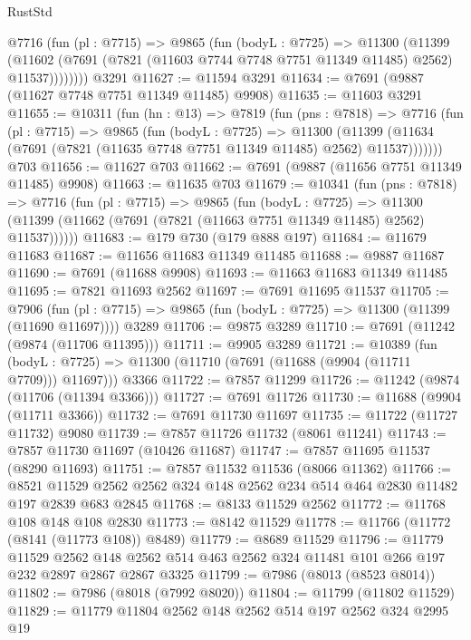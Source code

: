 \begin{lexlean}{RustStd}
\begin{coremodule}
        @7716
          (fun (pl : @7715) =>
          @9865
            (fun (bodyL : @7725) =>
            @11300
              (@11399
                (@11602 (@7691 (@7821 (@11603 @7744 @7748 @7751 @11349 @11485) @2562) @11537))))))))
    @3291
@11627 := @11594 @3291
@11634 := @7691 (@9887 (@11627 @7748 @7751 @11349 @11485) @9908)
@11635 := @11603 @3291
@11655 := @10311
    (fun (hn : @13) =>
    @7819
      (fun (pns : @7818) =>
      @7716
        (fun (pl : @7715) =>
        @9865
          (fun (bodyL : @7725) =>
          @11300
            (@11399 (@11634 (@7691 (@7821 (@11635 @7748 @7751 @11349 @11485) @2562) @11537)))))))
    @703
@11656 := @11627 @703
@11662 := @7691 (@9887 (@11656 @7751 @11349 @11485) @9908)
@11663 := @11635 @703
@11679 := @10341
    (fun (pns : @7818) =>
    @7716
      (fun (pl : @7715) =>
      @9865
        (fun (bodyL : @7725) =>
        @11300 (@11399 (@11662 (@7691 (@7821 (@11663 @7751 @11349 @11485) @2562) @11537))))))
@11683 := @179 @730 (@179 @888 @197)
@11684 := @11679 @11683
@11687 := @11656 @11683 @11349 @11485
@11688 := @9887 @11687
@11690 := @7691 (@11688 @9908)
@11693 := @11663 @11683 @11349 @11485
@11695 := @7821 @11693 @2562
@11697 := @7691 @11695 @11537
@11705 := @7906
    (fun (pl : @7715) => @9865 (fun (bodyL : @7725) => @11300 (@11399 (@11690 @11697))))
    @3289
@11706 := @9875 @3289
@11710 := @7691 (@11242 (@9874 (@11706 @11395)))
@11711 := @9905 @3289
@11721 := @10389
    (fun (bodyL : @7725) => @11300 (@11710 (@7691 (@11688 (@9904 (@11711 @7709))) @11697)))
    @3366
@11722 := @7857 @11299
@11726 := @11242 (@9874 (@11706 (@11394 @3366)))
@11727 := @7691 @11726
@11730 := @11688 (@9904 (@11711 @3366))
@11732 := @7691 @11730 @11697
@11735 := @11722 (@11727 @11732) @9080
@11739 := @7857 @11726 @11732 (@8061 @11241)
@11743 := @7857 @11730 @11697 (@10426 @11687)
@11747 := @7857 @11695 @11537 (@8290 @11693)
@11751 := @7857 @11532 @11536 (@8066 @11362)
@11766 := @8521 @11529 @2562 @2562 @324 @148 @2562 @234 @514 @464 @2830 @11482 @197 @2839 @683 @2845
@11768 := @8133 @11529 @2562
@11772 := @11768 @108 @148 @108 @2830
@11773 := @8142 @11529
@11778 := @11766 (@11772 (@8141 (@11773 @108)) @8489)
@11779 := @8689 @11529
@11796 := @11779
    @11529
    @2562
    @148
    @2562
    @514
    @463
    @2562
    @324
    @11481
    @101
    @266
    @197
    @232
    @2897
    @2867
    @2867
    @3325
@11799 := @7986 (@8013 (@8523 @8014))
@11802 := @7986 (@8018 (@7992 @8020))
@11804 := @11799 (@11802 @11529)
@11829 := @11779
    @11804
    @2562
    @148
    @2562
    @514
    @197
    @2562
    @324
    @2995
    @19

\end{coremodule}
\end{lexlean}
